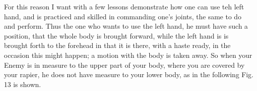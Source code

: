 \newpage


\newpage


For this reason I want with a few lessons demonstrate how one can use
teh left hand, and is practiced and skilled in commanding one's
joints, the same to do and perform. Thus the one who wants to use the
left hand, he must have such a position, that the whole body is
brought forward, while the left hand is is brought forth to the
forehead in that it is there, with a haste ready, in the occasion this
might happen; a motion with the body is taken away.
So when your Enemy is in measure to the upper part of your body, where
you are covered by your rapier, he does not have measure to your lower
body, as in the following Fig. 13 is shown.
